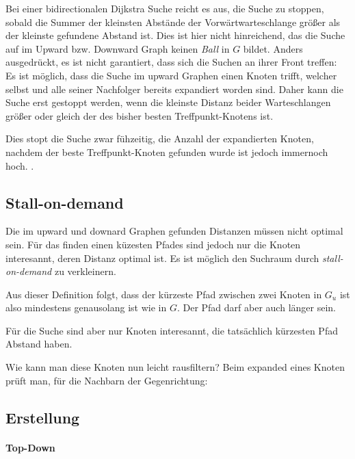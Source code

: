 Bei einer bidirectionalen Dijkstra Suche reicht es aus, die Suche zu stoppen, sobald die Summer der kleinsten Abstände der Vorwärtwarteschlange größer als der kleinste gefundene Abstand ist.
Dies ist hier nicht hinreichend, das die Suche auf im Upward bzw. Downward Graph keinen \emph{Ball} in $G$ bildet.
Anders ausgedrückt, es ist nicht garantiert, dass sich die Suchen an ihrer Front treffen:
Es ist möglich, dass die Suche im upward Graphen einen Knoten trifft, welcher selbst und alle seiner Nachfolger bereits expandiert worden sind.
Daher kann die Suche erst gestoppt werden, wenn die kleinste Distanz beider Warteschlangen größer oder gleich der des bisher besten Treffpunkt-Knotens ist.

Dies stopt die Suche zwar fühzeitig, die Anzahl der expandierten Knoten, nachdem der beste Treffpunkt-Knoten gefunden wurde ist jedoch immernoch hoch.
.

\subsection{Stall-on-demand}

Die im upward und downard Graphen gefunden Distanzen müssen nicht optimal sein.
Für das finden einen küzesten Pfades sind jedoch nur die Knoten interesannt, deren Distanz optimal ist.
Es ist möglich den Suchraum durch \emph{stall-on-demand} zu verkleinern.


Aus dieser Definition folgt, dass der kürzeste Pfad zwischen zwei Knoten in $G_u$ ist also mindestens genausolang ist wie in $G$.
Der Pfad darf aber auch länger sein.


Für die Suche sind aber nur Knoten interesannt, die tatsächlich kürzesten Pfad Abstand haben.

Wie kann man diese Knoten nun leicht rausfiltern?
Beim expanded eines Knoten prüft man, für die Nachbarn der Gegenrichtung:


\subsection{Erstellung}

\paragraph{Top-Down}

